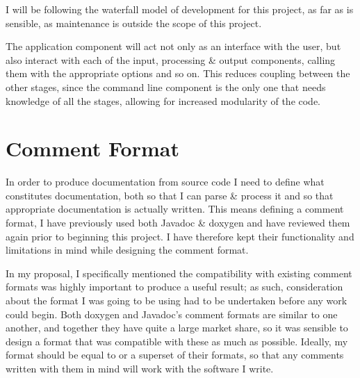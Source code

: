 I will be following the waterfall model of development for this project, as far
as is sensible, as maintenance is outside the scope of this project.

\begin{center}
  \vspace*{5mm}
\end{center}

The application component will act not only as an interface with the user, but
also interact with each of the input, processing \& output components, calling
them with the appropriate options and so on. This reduces coupling between the
other stages, since the command line component is the only one that needs
knowledge of all the stages, allowing for increased modularity of the code.

\section{Comment Format}
In order to produce documentation from source code I need to define what
constitutes documentation, both so that I can parse \& process it and so that
appropriate documentation is actually written. This means defining a comment
format, I have previously used both Javadoc \& doxygen and have reviewed them
again prior to beginning this project. I have therefore kept their functionality
and limitations in mind while designing the comment format.

In my proposal, I specifically mentioned the compatibility with existing comment
formats was highly important to produce a useful result; as such, consideration
about the format I was going to be using had to be undertaken before any work
could begin. Both doxygen and Javadoc's comment formats are similar to one
another, and together they have quite a large market share, so it was sensible
to design a format that was compatible with these as much as possible. Ideally,
my format should be equal to or a superset of their formats, so that any
comments written with them in mind will work with the software I write.

